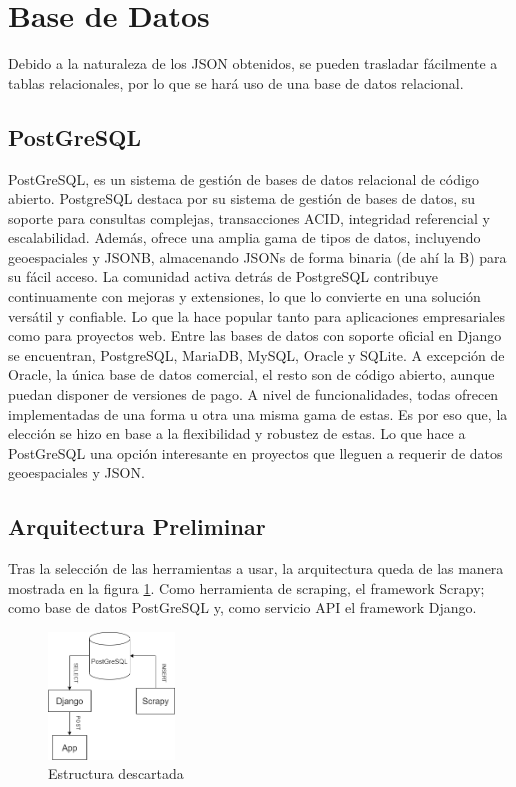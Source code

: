\section{Base de Datos}
Debido a la naturaleza de los JSON obtenidos, se pueden trasladar fácilmente a tablas relacionales, por lo que se hará uso de una base de datos relacional.

\subsection{PostGreSQL}
PostGreSQL, es un sistema de gestión de bases de datos relacional de código abierto. PostgreSQL destaca por su sistema de gestión de bases de datos, su soporte para consultas complejas, transacciones ACID, integridad referencial y escalabilidad. Además, ofrece una amplia gama de tipos de datos, incluyendo geoespaciales y JSONB, almacenando JSONs de forma binaria (de ahí la B) para su fácil acceso.\newline
\newline
La comunidad activa detrás de PostgreSQL contribuye continuamente con mejoras y extensiones, lo que lo convierte en una solución versátil y confiable. Lo que la hace popular tanto para aplicaciones empresariales como para proyectos web. Entre las bases de datos con soporte oficial en Django se encuentran, PostgreSQL, MariaDB, MySQL, Oracle y SQLite. A excepción de Oracle, la única base de datos comercial, el resto son de código abierto, aunque puedan disponer de versiones de pago.\newline
\newline
A nivel de funcionalidades, todas ofrecen implementadas de una forma u otra una misma gama de estas. Es por eso que, la elección se hizo en base a la flexibilidad y robustez de estas. Lo que hace a PostGreSQL una opción interesante en proyectos que lleguen a requerir de datos geoespaciales y JSON.

\subsection{Arquitectura Preliminar}
Tras la selección de las herramientas a usar, la arquitectura queda de las manera mostrada en la figura \ref{fig:ej9}. Como herramienta de scraping, el framework Scrapy; como base de datos PostGreSQL y, como servicio API el framework Django.

\begin{figure} [H]
	\centering
	\includegraphics[width=0.3\textwidth]{fig/estructura_descartada.png}
	\caption[Idea original de la estructura de datos planteada]{Estructura descartada}
	\label{fig:ej9}
\end{figure}

